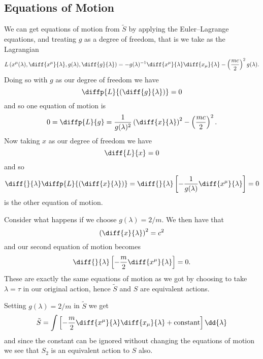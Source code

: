 \subsection{Equations of Motion}
We can get equations of motion from \(\tilde{S}\) by applying the Euler--Lagrange equations, and treating \(g\) as a degree of freedom, that is we take as the Lagrangian
\begin{equation}
    \lagrangian\left( x^\mu(\lambda), \diff{x^\mu}{\lambda}, g(\lambda), \diff{g}{\lambda} \right) = -g(\lambda)^{-1} \diff{x^\mu}{\lambda}\diff{x_\mu}{\lambda} - \left( \frac{mc}{2} \right)^2 g(\lambda).
\end{equation}
Doing so with \(g\) as our degree of freedom we have
\begin{equation}
    \diffp{\lagrangian}{\left( \diff{g}{\lambda} \right)} = 0
\end{equation}
and so one equation of motion is
\begin{equation}
    0 = \diffp{\lagrangian}{g} = \frac{1}{g(\lambda)^2} \left( \diff{x}{\lambda} \right)^2 - \left( \frac{mc}{2} \right)^2.
\end{equation}
Now taking \(x\) as our degree of freedom we have
\begin{equation}
    \diff{\lagrangian}{x} = 0
\end{equation}
and so
\begin{equation}
    \diff{}{\lambda}\diffp{\lagrangian}{\left( \diff{x}{\lambda} \right)} = \diff{}{\lambda} \left[ -\frac{1}{g(\lambda)} \diff{x^\mu}{\lambda} \right] = 0
\end{equation}
is the other equation of motion.

Consider what happens if we choose \(g(\lambda) = 2/m\).
We then have that
\begin{equation}
    \left( \diff{x}{\lambda} \right)^2  = c^2
\end{equation}
and our second equation of motion becomes
\begin{equation}
    \diff{}{\lambda}\left[ -\frac{m}{2} \diff{x^\mu}{\lambda} \right] = 0.
\end{equation}
These are exactly the same equations of motion as we got by choosing to take \(\lambda = \tau\) in our original action, hence \(\tilde{S}\) and \(S\) are equivalent actions.

Setting \(g(\lambda) = 2/m\) in \(\tilde{S}\) we get
\begin{equation}
    \tilde{S} = \int \left[ -\frac{m}{2}\diff{x^\mu}{\lambda}\diff{x_\mu}{\lambda} + \text{constant} \right]\dd{\lambda}
\end{equation}
and since the constant can be ignored without changing the equations of motion we see that \(S_2\) is an equivalent action to \(S\) also.

